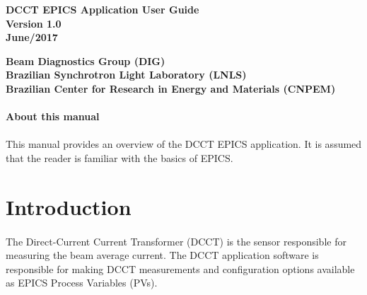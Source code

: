 \documentclass[openany]{article}
\begin{document}
\begin{titlepage}

\thispagestyle{fancy}

\begin{center}

\vspace*{\fill}
\textbf{\Huge DCCT EPICS Application User Guide}\\[20pt]
\textbf{\Huge Version 1.0}\\[20pt]
\textbf{\Huge June/2017}
\vspace*{\fill}

\vfill
\textbf{Beam Diagnostics Group (DIG)}\\[5pt]
\textbf{Brazilian Synchrotron Light Laboratory (LNLS)}\\[5pt]
\textbf{Brazilian Center for Research in Energy and Materials (CNPEM)}
\end{center}

\end{titlepage}

\newpage
\pagestyle{plain} %

\paragraph{}{\Large\bfseries About this manual}

\paragraph{} This manual provides an overview of the DCCT EPICS application. It is assumed that the reader is familiar with the basics of EPICS.

\tableofcontents

\newpage
\section{Introduction}

\paragraph{} The Direct-Current Current Transformer (DCCT) is the sensor responsible for measuring the beam average current. The DCCT application software is responsible for making DCCT measurements and configuration options available as EPICS Process Variables (PVs).
\end{document}
